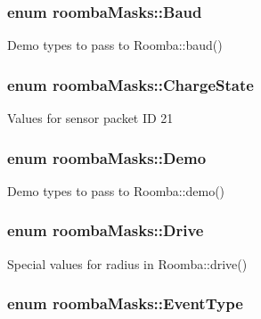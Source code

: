 \hypertarget{namespaceroomba_masks_a807fb9ebae76dcdf09f8b13e4a8c8929}{
\subsubsection[{Baud}]{\setlength{\rightskip}{0pt plus 5cm}enum {\bf roombaMasks::Baud}}}
\label{namespaceroomba_masks_a807fb9ebae76dcdf09f8b13e4a8c8929}
Demo types to pass to Roomba::baud() \hypertarget{namespaceroomba_masks_ad2fb0f1f3ca9679388699bd02a12314b}{
\subsubsection[{ChargeState}]{\setlength{\rightskip}{0pt plus 5cm}enum {\bf roombaMasks::ChargeState}}}
\label{namespaceroomba_masks_ad2fb0f1f3ca9679388699bd02a12314b}
Values for sensor packet ID 21 \hypertarget{namespaceroomba_masks_a7e1411202b98dcb794a4d43593c73e71}{
\subsubsection[{Demo}]{\setlength{\rightskip}{0pt plus 5cm}enum {\bf roombaMasks::Demo}}}
\label{namespaceroomba_masks_a7e1411202b98dcb794a4d43593c73e71}
Demo types to pass to Roomba::demo() \hypertarget{namespaceroomba_masks_a66506fb37d03bb0332fc796c2018346b}{
\subsubsection[{Drive}]{\setlength{\rightskip}{0pt plus 5cm}enum {\bf roombaMasks::Drive}}}
\label{namespaceroomba_masks_a66506fb37d03bb0332fc796c2018346b}
Special values for radius in Roomba::drive() \hypertarget{namespaceroomba_masks_ae0312bb70700bedf6fce9ef231933ecb}{
\subsubsection[{EventType}]{\setlength{\rightskip}{0pt plus 5cm}enum {\bf roombaMasks::EventType}}}
\label{namespaceroomba_masks_ae0312bb70700bedf6fce9ef231933ecb}
